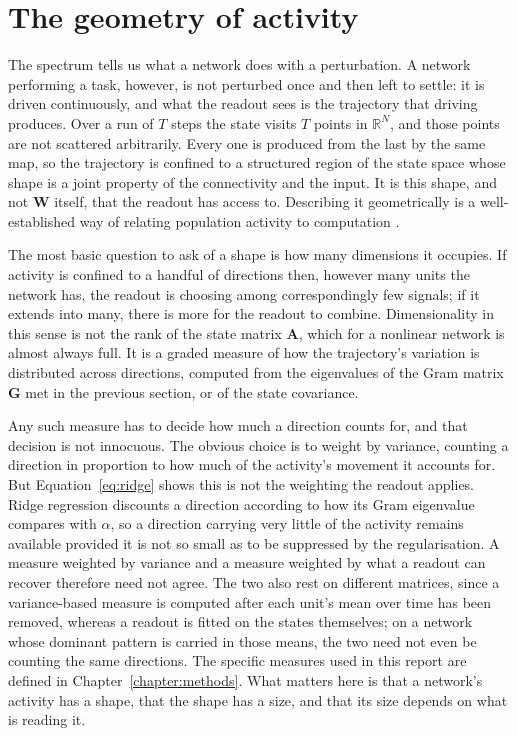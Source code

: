 \section{The geometry of activity}
\label{section:ch2_4}
\bigskip

The spectrum tells us what a network does with a perturbation. A network performing a task, however,
is not perturbed once and then left to settle: it is driven continuously, and what the readout sees
is the trajectory that driving produces. Over a run of $T$ steps the state visits $T$ points in
$\mathbb{R}^{N}$, and those points are not scattered arbitrarily. Every one is produced from the last
by the same map, so the trajectory is confined to a structured region of the state space whose shape
is a joint property of the connectivity and the input. It is this shape, and not $\mathbf{W}$ itself,
that the readout has access to. Describing it geometrically is a well-established way of relating
population activity to computation \cite{chung2021neural,vyas2020computation}.

The most basic question to ask of a shape is how many dimensions it occupies. If activity is confined
to a handful of directions then, however many units the network has, the readout is choosing among
correspondingly few signals; if it extends into many, there is more for the readout to combine.
Dimensionality in this sense is not the rank of the state matrix $\mathbf{A}$, which for a nonlinear network
is almost always full. It is a graded measure of how the trajectory's variation is distributed across
directions, computed from the eigenvalues of the Gram matrix $\mathbf{G}$ met in the previous section, or of
the state covariance.

Any such measure has to decide how much a direction counts for, and that decision is not innocuous.
The obvious choice is to weight by variance, counting a direction in proportion to how much of the
activity's movement it accounts for. But Equation~\ref{eq:ridge} shows this is not the weighting the
readout applies. Ridge regression discounts a direction according to how its Gram eigenvalue compares
with $\alpha$, so a direction carrying very little of the activity remains available provided it is
not so small as to be suppressed by the regularisation. A measure weighted by variance and a measure
weighted by what a readout can recover therefore need not agree. The two also rest on different
matrices, since a variance-based measure is computed after each unit's mean over time has been
removed, whereas a readout is fitted on the states themselves; on a network whose dominant pattern is
carried in those means, the two need not even be counting the same directions. The specific measures
used in this report are defined in Chapter~\ref{chapter:methods}. What matters here is that a
network's activity has a shape, that the shape has a size, and that its size depends on what is
reading it.


